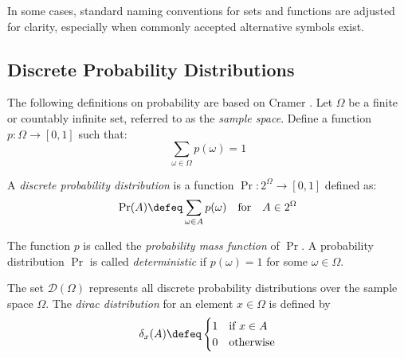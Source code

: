 In some cases, standard naming conventions for sets and functions are adjusted for clarity, especially when commonly accepted alternative symbols exist.

\subsection{Discrete Probability Distributions}
The following definitions on probability are based on Cramer \cite[Chapter 2]{cramer_statistik_2007}. Let $\Omega$ be a finite or countably infinite set, referred to as the \textit{sample space}. Define a function $p: \Omega \to [0, 1]$ such that:
\[
\sum_{\omega \in \Omega} p(\omega) = 1
\]

A \textit{discrete probability distribution} is a function $\Pr: 2^\Omega \to [0, 1]$ defined as:
\[
\Pr(A) \defeq \sum_{\omega \in A} p(\omega) \quad \text{for} \quad A \in 2^\Omega
\]

The function $p$ is called the \textit{probability mass function} of $\Pr$. A probability distribution $\Pr$ is called \textit{deterministic} if $p(\omega)=1$ for some $\omega\in\Omega$.

The set $\mathcal{D}(\Omega)$ represents all discrete probability distributions over the sample space $\Omega$. The \textit{dirac distribution} for an element $x\in\Omega$ is defined by \[
\delta_x(A)\defeq\begin{cases}
    1 & \text{if } x \in A\\
    0 & \text{otherwise}\\
\end{cases}\]


